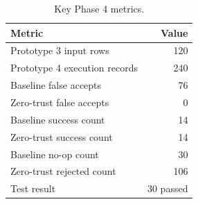 \begin{table}[htbp]
\centering
\caption{Key Phase 4 metrics.}
\label{tab:phase4_key_metrics}
\begin{tabular}{lr}
\hline
Metric & Value \\
\hline
Prototype 3 input rows & 120 \\
Prototype 4 execution records & 240 \\
Baseline false accepts & 76 \\
Zero-trust false accepts & 0 \\
Baseline success count & 14 \\
Zero-trust success count & 14 \\
Baseline no-op count & 30 \\
Zero-trust rejected count & 106 \\
Test result & 30 passed \\
\hline
\end{tabular}
\end{table}
